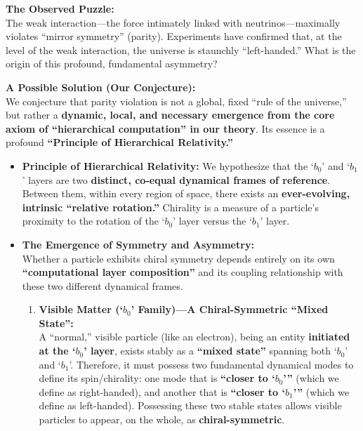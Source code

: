 \documentclass[11pt, a4paper]{article}
\begin{document}
\noindent\textbf{The Observed Puzzle:}\\
The weak interaction—the force intimately linked with neutrinos—maximally violates ``mirror symmetry'' (parity). Experiments have confirmed that, at the level of the weak interaction, the universe is staunchly ``left-handed.'' What is the origin of this profound, fundamental asymmetry?

\noindent\textbf{A Possible Solution (Our Conjecture):}\\
We conjecture that parity violation is not a global, fixed ``rule of the universe,'' but rather a \textbf{dynamic, local, and necessary emergence from the core axiom of ``hierarchical computation'' in our theory}. Its essence is a profound \textbf{``Principle of Hierarchical Relativity.''}

\begin{itemize}
    \item \textbf{Principle of Hierarchical Relativity:} We hypothesize that the `$b_0$' and `$b_1$' layers are two \textbf{distinct, co-equal dynamical frames of reference}. Between them, within every region of space, there exists an \textbf{ever-evolving, intrinsic ``relative rotation.''} Chirality is a measure of a particle's proximity to the rotation of the `$b_0$' layer versus the `$b_1$' layer.

    \item \textbf{The Emergence of Symmetry and Asymmetry:} \\
    Whether a particle exhibits chiral symmetry depends entirely on its own \textbf{``computational layer composition''} and its coupling relationship with these two different dynamical frames.
    \begin{enumerate}
        \item \textbf{Visible Matter (`$b_0$' Family)—A Chiral-Symmetric ``Mixed State'':}\\
        A ``normal,'' visible particle (like an electron), being an entity \textbf{initiated at the `$b_0$' layer}, exists stably as a \textbf{``mixed state''} spanning both `$b_0$' and `$b_1$'. Therefore, it must possess two fundamental dynamical modes to define its spin/chirality: one mode that is \textbf{``closer to `$b_0$'''} (which we define as right-handed), and another that is \textbf{``closer to `$b_1$'''} (which we define as left-handed). Possessing these two stable states allows visible particles to appear, on the whole, as \textbf{chiral-symmetric}.


\end{enumerate}
\end{itemize}
\end{document}
